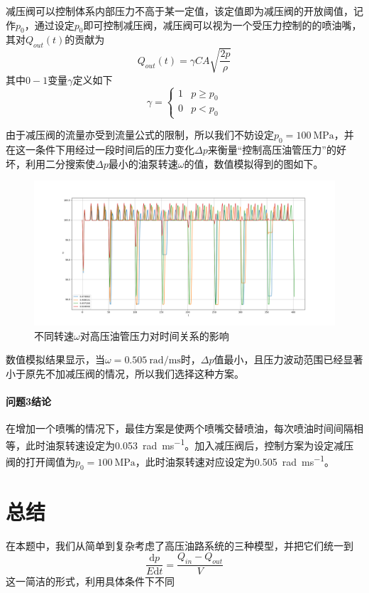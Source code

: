 \documentclass[12pt,AutoFakeBold]{article}%
\newcommand{\dif}{\mathrm{d}}
\begin{document}
    减压阀可以控制体系内部压力不高于某一定值，该定值即为减压阀的开放阈值，记作$p_0$，通过设定$p_0$即可控制减压阀，减压阀可以视为一个受压力控制的的喷油嘴，其对$Q_{out}(t)$的贡献为
    \begin{equation}
        Q_{out}(t)=\gamma CA\sqrt{\frac{2p}{\rho}}
    \end{equation}
    其中$0-1$变量$\gamma$定义如下
    \begin{equation}
        \gamma=
        \begin{cases}
            1&p\geq p_0\\
            0&p<p_0
        \end{cases}
    \end{equation}\par
    由于减压阀的流量亦受到流量公式的限制，所以我们不妨设定$p_0=\SI{100}{\MPa}$，并在这一条件下用经过一段时间后的压力变化$\Delta p$来衡量“控制高压油管压力”的好坏，利用二分搜索使$\Delta p$最小的油泵转速$\omega$的值，数值模拟得到的图如下。
    \begin{figure}[H]
        \centering
        \includegraphics[scale=0.32]{figure/3-5.png}
        \caption{不同转速$\omega$对高压油管压力对时间关系的影响}
    \end{figure}\par
    数值模拟结果显示，当$\omega=\SI{0.505}{\radian\per\ms}$时，$\Delta p$值最小，且压力波动范围已经显著小于原先不加减压阀的情况，所以我们选择这种方案。
    \paragraph{问题3结论}
    在增加一个喷嘴的情况下，最佳方案是使两个喷嘴交替喷油，每次喷油时间间隔相等，此时油泵转速设定为\SI{0.053}{\radian\per\ms}。加入减压阀后，控制方案为设定减压阀的打开阈值为$p_0=\SI{100}{\MPa}$，此时油泵转速对应设定为\SI{0.505}{\radian\per\ms}。

    
    \section{总结}
    在本题中，我们从简单到复杂考虑了高压油路系统的三种模型，并把它们统一到
    \[\frac{\dif p}{E\dif t}=\frac{Q_{in}-Q_{out}}{V}\]
    这一简洁的形式，利用具体条件下不同
\end{document}
